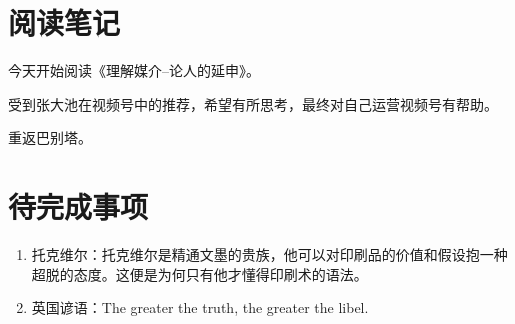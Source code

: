 \documentclass[UTF8]{ctexart}
\date{\today}
\author{陈诗}
\begin{document}
    
\section{阅读笔记}
今天开始阅读《理解媒介--论人的延申》。

受到张大池在视频号中的推荐，希望有所思考，最终对自己运营视频号有帮助。

重返巴别塔。



\section{待完成事项}
\begin{enumerate}
    \item 托克维尔：托克维尔是精通文墨的贵族，他可以对印刷品的价值和假设抱一种超脱的态度。这便是为何只有他才懂得印刷术的语法。
    \item 英国谚语：The greater the truth, the greater the libel.
\end{enumerate}
\end{document}
